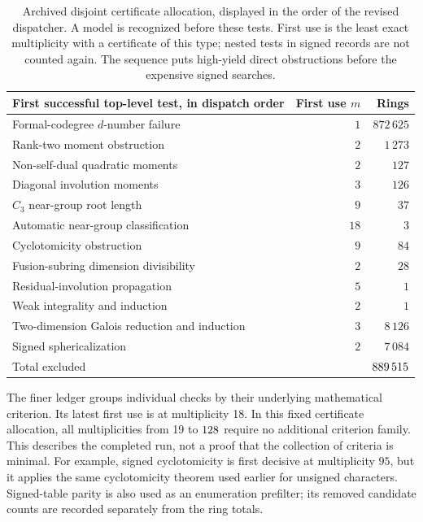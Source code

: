 \begin{table}[ht]
\centering
\begin{tabular}{p{.66\linewidth}rr}
\toprule
First successful top-level test, in dispatch order & First use $m$ & Rings\\
\midrule
Formal-codegree $d$-number failure & $1$ & $872\,625$\\
Rank-two moment obstruction & $2$ & $1\,273$\\
Non-self-dual quadratic moments & $2$ & $127$\\
Diagonal involution moments & $3$ & $126$\\
$C_3$ near-group root length & $9$ & $37$\\
Automatic near-group classification & $18$ & $3$\\
Cyclotomicity obstruction & $9$ & $84$\\
Fusion-subring dimension divisibility & $2$ & $28$\\
Residual-involution propagation & $5$ & $1$\\
Weak integrality and induction & $2$ & $1$\\
Two-dimension Galois reduction and induction & $3$ & $8\,126$\\
Signed sphericalization & $2$ & $7\,084$\\
\midrule
Total excluded & & $889\,515$\\
\bottomrule
\end{tabular}
\caption{Archived disjoint certificate allocation, displayed in the order
of the revised dispatcher. A model is recognized before these tests. First
use is the least exact multiplicity with a certificate of this type;
nested tests in signed records are not counted again. The sequence puts
high-yield direct obstructions before the expensive signed searches.}
\label{tab:proof-counts}
\end{table}
\noindent The finer ledger groups individual checks by their underlying
mathematical criterion. Its latest first use is at multiplicity 18.
In this fixed certificate allocation, all multiplicities from 19 to
$128$ require no additional criterion family. This describes
the completed run, not a proof that the collection of criteria is minimal.
For example, signed cyclotomicity is first decisive at multiplicity $95$,
but it applies the same cyclotomicity theorem used earlier for unsigned
characters. Signed-table parity is also used as an enumeration prefilter;
its removed candidate counts are recorded separately from the ring totals.
